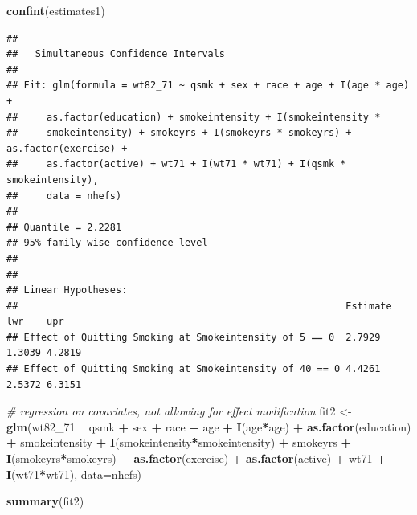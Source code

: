 \documentclass[
  10pt,
]{book}
\newenvironment{Shaded}{\begin{snugshade}}{\end{snugshade}}
\newcommand{\CommentTok}[1]{\textcolor[rgb]{0.56,0.35,0.01}{\textit{#1}}}
\newcommand{\DataTypeTok}[1]{\textcolor[rgb]{0.13,0.29,0.53}{#1}}
\newcommand{\DecValTok}[1]{\textcolor[rgb]{0.00,0.00,0.81}{#1}}
\newcommand{\KeywordTok}[1]{\textcolor[rgb]{0.13,0.29,0.53}{\textbf{#1}}}
\newcommand{\NormalTok}[1]{#1}
\newcommand{\OperatorTok}[1]{\textcolor[rgb]{0.81,0.36,0.00}{\textbf{#1}}}
\newcommand{\StringTok}[1]{\textcolor[rgb]{0.31,0.60,0.02}{#1}}
\begin{document}
\begin{Shaded}
\begin{Highlighting}[]
  \KeywordTok{confint}\NormalTok{(estimates1)}
\end{Highlighting}
\end{Shaded}

\begin{verbatim}
## 
## 	 Simultaneous Confidence Intervals
## 
## Fit: glm(formula = wt82_71 ~ qsmk + sex + race + age + I(age * age) + 
##     as.factor(education) + smokeintensity + I(smokeintensity * 
##     smokeintensity) + smokeyrs + I(smokeyrs * smokeyrs) + as.factor(exercise) + 
##     as.factor(active) + wt71 + I(wt71 * wt71) + I(qsmk * smokeintensity), 
##     data = nhefs)
## 
## Quantile = 2.2281
## 95% family-wise confidence level
##  
## 
## Linear Hypotheses:
##                                                         Estimate lwr    upr   
## Effect of Quitting Smoking at Smokeintensity of 5 == 0  2.7929   1.3039 4.2819
## Effect of Quitting Smoking at Smokeintensity of 40 == 0 4.4261   2.5372 6.3151
\end{verbatim}

\begin{Shaded}
\begin{Highlighting}[]
\CommentTok{# regression on covariates, not allowing for effect modification}
\NormalTok{fit2 <-}\StringTok{ }\KeywordTok{glm}\NormalTok{(wt82_}\DecValTok{71} \OperatorTok{~}\StringTok{ }\NormalTok{qsmk }\OperatorTok{+}\StringTok{ }\NormalTok{sex }\OperatorTok{+}\StringTok{ }\NormalTok{race }\OperatorTok{+}\StringTok{ }\NormalTok{age }\OperatorTok{+}\StringTok{ }\KeywordTok{I}\NormalTok{(age}\OperatorTok{*}\NormalTok{age) }\OperatorTok{+}\StringTok{ }\KeywordTok{as.factor}\NormalTok{(education)}
           \OperatorTok{+}\StringTok{ }\NormalTok{smokeintensity }\OperatorTok{+}\StringTok{ }\KeywordTok{I}\NormalTok{(smokeintensity}\OperatorTok{*}\NormalTok{smokeintensity) }\OperatorTok{+}\StringTok{ }\NormalTok{smokeyrs}
           \OperatorTok{+}\StringTok{ }\KeywordTok{I}\NormalTok{(smokeyrs}\OperatorTok{*}\NormalTok{smokeyrs) }\OperatorTok{+}\StringTok{ }\KeywordTok{as.factor}\NormalTok{(exercise) }\OperatorTok{+}\StringTok{ }\KeywordTok{as.factor}\NormalTok{(active)}
           \OperatorTok{+}\StringTok{ }\NormalTok{wt71 }\OperatorTok{+}\StringTok{ }\KeywordTok{I}\NormalTok{(wt71}\OperatorTok{*}\NormalTok{wt71), }\DataTypeTok{data=}\NormalTok{nhefs)}
  
\KeywordTok{summary}\NormalTok{(fit2)}
\end{Highlighting}
\end{Shaded}
\end{document}

